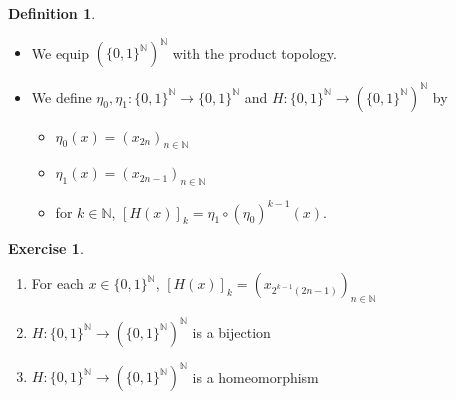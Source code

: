 \documentclass{book}
\theoremstyle{definition}
\newtheorem{defn}[definition]{Definition}
\newtheorem{ex}[definition]{Exercise}
\newcommand{\N}{\mathbb{N}}
\DeclareMathOperator*{\0}{\mbf{0}}
\DeclareMathOperator*{\1}{\mbf{1}}
\begin{document}
	\begin{defn}\
		\begin{itemize}
			\item We equip $(\{0,1\}^{\N})^{\N}$ with the product topology.
			\item We define $\eta_0, \eta_1: \{0,1\}^{\N} \rightarrow \{0,1\}^{\N}$ and $H: \{0,1\}^{\N} \rightarrow (\{0,1\}^{\N})^{\N}$ by
			\begin{itemize}
				\item  $\eta_0(x) = (x_{2n})_{n \in \N}$
				\item $\eta_1(x) = (x_{2n-1})_{n \in \N}$ 
				\item for $k \in \N$, $[H(x)]_k = \eta_1 \circ (\eta_0)^{k-1}(x)$. 
			\end{itemize}
		\end{itemize}
	\end{defn}
	
	\begin{ex}\
		\begin{enumerate}
			\item For each $x \in \{0,1\}^{\N}$, $[H(x)]_k = (x_{2^{k-1}(2n-1)})_{n \in \N}$
			\item $H: \{0,1\}^{\N} \rightarrow (\{0,1\}^{\N})^{\N}$ is a bijection
			\item $H: \{0,1\}^{\N} \rightarrow (\{0,1\}^{\N})^{\N}$ is a homeomorphism
		\end{enumerate}
	\end{ex}
	
\end{document}
